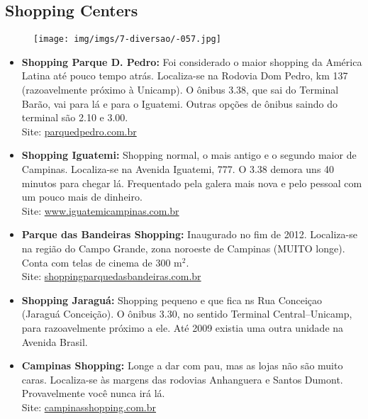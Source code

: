 \subsection{Shopping Centers}

\begin{figure}[h!]
    \centering
    \texttt{[image: img/imgs/7-diversao/-057.jpg]}
\end{figure}

\begin{itemize}

\item   \textbf{Shopping Parque D. Pedro:} Foi considerado o maior shopping da
        América Latina até pouco tempo atrás. Localiza-se na Rodovia Dom Pedro,
        km 137 (razoavelmente próximo à Unicamp). O ônibus 3.38, que sai do
        Terminal Barão, vai para lá e para o Iguatemi. Outras opções de ônibus
        saindo do terminal são 2.10 e 3.00.
        \\Site: \url{parquedpedro.com.br}

\item   \textbf{Shopping Iguatemi:} Shopping normal, o mais antigo e o segundo
        maior de Campinas. Localiza-se na Avenida Iguatemi, 777. O 3.38 demora
        uns 40 minutos para chegar lá. Frequentado pela galera mais nova e pelo
        pessoal com um pouco mais de dinheiro.
        \\Site: \url{www.iguatemicampinas.com.br}

\item   \textbf{Parque das Bandeiras Shopping:} Inaugurado no fim de 2012.
        Localiza-se na região do Campo Grande, zona noroeste de Campinas 
        (MUITO longe). Conta com telas de cinema de 300 m$^{2}$.
        \\Site: \url{shoppingparquedasbandeiras.com.br}

\item   \textbf{Shopping Jaraguá:} Shopping pequeno e que fica ns Rua Conceiçao 
        (Jaraguá Conceição). O ônibus 3.30, no sentido Terminal Central--Unicamp,
         para razoavelmente próximo a ele. Até 2009 existia uma outra unidade na
         Avenida Brasil.

\item   \textbf{Campinas Shopping:} Longe a dar com pau, mas as lojas não são
        muito caras. Localiza-se às margens das rodovias Anhanguera e Santos
        Dumont. Provavelmente você nunca irá lá.
        \\Site: \url{campinasshopping.com.br}


\end{itemize}
